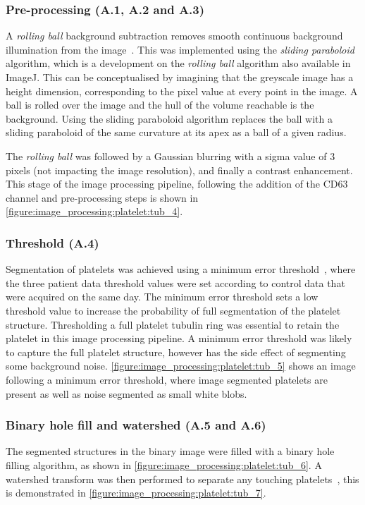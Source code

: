 \subsubsection{Pre-processing (A.1, A.2 and A.3)}
A \emph{rolling ball} background subtraction removes smooth continuous background illumination from the image~\cite{Sternberg1983}. This was implemented using the \emph{sliding paraboloid} algorithm, which is a development on the \emph{rolling ball} algorithm also available in ImageJ. This can be conceptualised by imagining that the greyscale image has a height dimension, corresponding to the pixel value at every point in the image. A ball is rolled over the image and the hull of the volume reachable is the background. Using the sliding paraboloid algorithm replaces the ball with a sliding paraboloid of the same curvature at its apex as a ball of a given radius.

The \emph{rolling ball} was followed by a Gaussian blurring with a sigma value of 3 pixels (not impacting the image resolution), and finally a contrast enhancement. This stage of the image processing pipeline, following the addition of the CD63 channel and pre-processing steps is shown in \autoref{figure:image_processing:platelet:tub_4}.

\subsubsection{Threshold (A.4)}
Segmentation of platelets was achieved using a minimum error threshold~\cite{Kittler1986}, where the three patient data threshold values were set according to control data that were acquired on the same day. The minimum error threshold sets a low threshold value to increase the probability of full segmentation of the platelet structure. Thresholding a full platelet tubulin ring was essential to retain the platelet in this image processing pipeline. A minimum error threshold was likely to capture the full platelet structure, however has the side effect of segmenting some background noise. \autoref{figure:image_processing:platelet:tub_5} shows an image following a minimum error threshold, where image segmented platelets are present as well as noise segmented as small white blobs.

\subsubsection{Binary hole fill and watershed (A.5 and A.6)}
The segmented structures in the binary image were filled with a binary hole filling algorithm, as shown in \autoref{figure:image_processing:platelet:tub_6}. A watershed transform was then performed to separate any touching platelets~\cite{Vincent1991}, this is demonstrated in \autoref{figure:image_processing:platelet:tub_7}.

